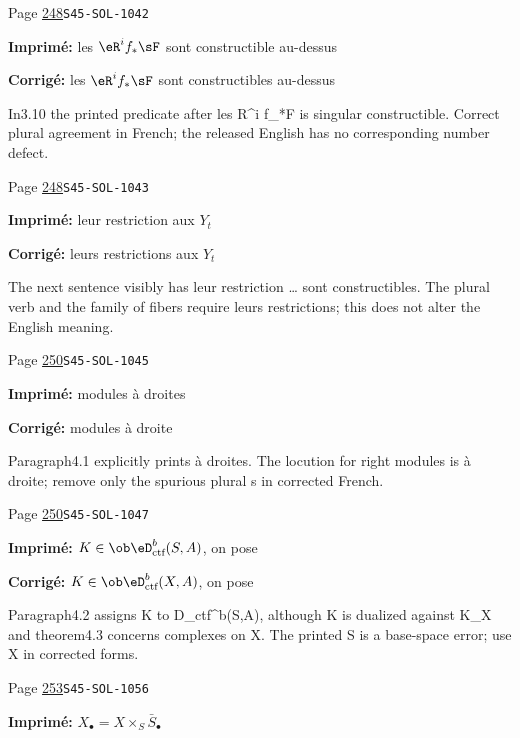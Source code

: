 \begin{description}
\smallskip
\item[\hypertarget{apparatus:FR-0258}{258}] Page \hyperlink{printpage:fr:248}{248}\quad\texttt{S45-SOL-1042}
\par\noindent\textbf{Imprimé:} les $\eR^i f_\ast \sF$ sont constructible au-dessus
\par\noindent\textbf{Corrigé:} les $\eR^i f_\ast \sF$ sont constructibles au-dessus
\par\noindent In3.10 the printed predicate after les R\textasciicircum{}i f\_*F is singular constructible. Correct plural agreement in French; the released English has no corresponding number defect.
\smallskip
\item[\hypertarget{apparatus:FR-0259}{259}] Page \hyperlink{printpage:fr:248}{248}\quad\texttt{S45-SOL-1043}
\par\noindent\textbf{Imprimé:} leur restriction 
aux $Y_t$
\par\noindent\textbf{Corrigé:} leurs restrictions 
aux $Y_t$
\par\noindent The next sentence visibly has leur restriction … sont constructibles. The plural verb and the family of fibers require leurs restrictions; this does not alter the English meaning.
\smallskip
\item[\hypertarget{apparatus:FR-0260}{260}] Page \hyperlink{printpage:fr:250}{250}\quad\texttt{S45-SOL-1045}
\par\noindent\textbf{Imprimé:} modules à droites
\par\noindent\textbf{Corrigé:} modules à droite
\par\noindent Paragraph4.1 explicitly prints à droites. The locution for right modules is à droite; remove only the spurious plural s in corrected French.
\smallskip
\item[\hypertarget{apparatus:FR-0261}{261}] Page \hyperlink{printpage:fr:250}{250}\quad\texttt{S45-SOL-1047}
\par\noindent\textbf{Imprimé:} $K\in\ob\eD_\text{ctf}^b(S,A)$, on pose
\par\noindent\textbf{Corrigé:} $K\in\ob\eD_\text{ctf}^b(X,A)$, on pose
\par\noindent Paragraph4.2 assigns K to D\_ctf\textasciicircum{}b(S,A), although K is dualized against K\_X and theorem4.3 concerns complexes on X. The printed S is a base-space error; use X in corrected forms.
\smallskip
\item[\hypertarget{apparatus:FR-0262}{262}] Page \hyperlink{printpage:fr:253}{253}\quad\texttt{S45-SOL-1056}
\par\noindent\textbf{Imprimé:} \(X_\bullet=X\times_S \bar S_\bullet\)

\end{description}
